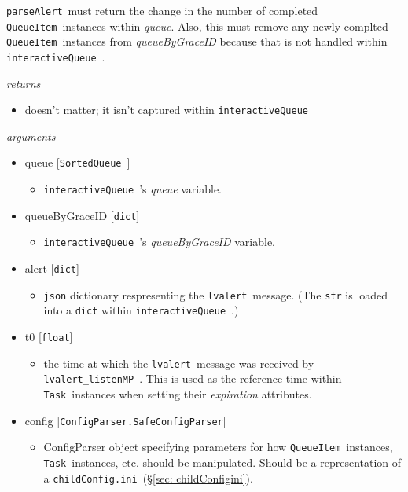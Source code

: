 \documentclass{article}
\newcommand{\alert}{\texttt{lvalert}~}
\newcommand{\lvalertListenMP}{\texttt{lvalert\_listenMP}~}
\newcommand{\interactiveQueue}{\texttt{interactiveQueue}~}
\newcommand{\parseAlert}{\texttt{parseAlert}~}
\newcommand{\SortedQueue}{\texttt{SortedQueue}~}
\newcommand{\QueueItem}{\texttt{QueueItem}~}
\newcommand{\Task}{\texttt{Task}~}
\newcommand{\childConfigini}{\texttt{childConfig.ini}~}
\begin{document}
\parseAlert must return the change in the number of completed \QueueItem instances within \textit{queue}.
Also, this must remove any newly complted \QueueItem instances from \textit{queueByGraceID} because that is not handled within \interactiveQueue.

\vspace{0.5cm}
\noindent
\textit{returns}

\begin{itemize}
    \item{doesn't matter; it isn't captured within \interactiveQueue}
\end{itemize}

\noindent
\textit{arguments}

\begin{itemize} 
    \item{queue [\SortedQueue]
        \begin{itemize}
            \item{\interactiveQueue's \textit{queue} variable.}
        \end{itemize}
         }
    \item{queueByGraceID [\texttt{dict}]
        \begin{itemize}
            \item{\interactiveQueue's \textit{queueByGraceID} variable.}
        \end{itemize}
         }
    \item{alert [\texttt{dict}]
        \begin{itemize}
            \item{\texttt{json} dictionary respresenting the \alert message. (The \texttt{str} is loaded into a \texttt{dict} within \interactiveQueue.)}
        \end{itemize}
         }
    \item{t0 [\texttt{float}]
        \begin{itemize}
            \item{the time at which the \alert message was received by \lvalertListenMP. This is used as the reference time within \Task instances when setting their \textit{expiration} attributes.}
        \end{itemize}
         }
    \item{config [\texttt{ConfigParser.SafeConfigParser}]
        \begin{itemize}
            \item{ConfigParser object specifying parameters for how \QueueItem instances, \Task instances, etc. should be manipulated. Should be a representation of a \childConfigini (\S\ref{sec: childConfigini}).}
        \end{itemize}
         }
\end{itemize}
\end{document}
